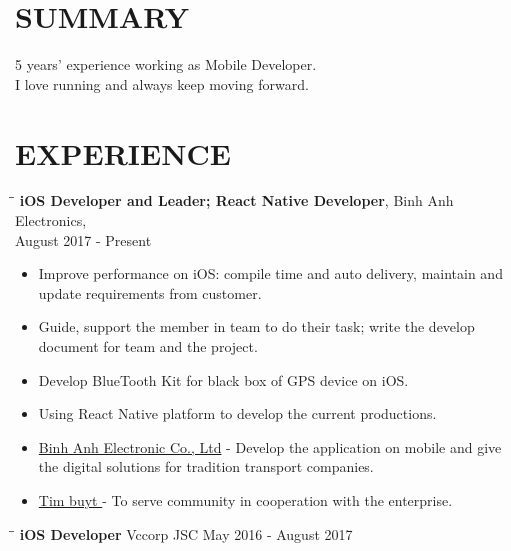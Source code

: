 \documentclass[margin, 10pt]{res}
\begin{document}
\begin{resume}
 
\section{SUMMARY}
   5 years' experience working as Mobile Developer.\\I love running and always keep moving forward.
 
\section{EXPERIENCE}
   \vspace{-0.1in}

   \begin{tabbing}
   \hspace{2.0in}\= \hspace{2.0in}\= \kill %
   {\bf iOS Developer and Leader; React Native Developer}, Binh Anh Electronics,\\August 2017 - Present
   \end{tabbing}\vspace{0pt} %

   \begin{itemize}
		\item Improve performance on iOS: compile time and auto delivery, maintain and update requirements from customer. 
		\item Guide, support the member in team to do their task; write the develop document for team and the project.
		\item Develop BlueTooth Kit for black box of GPS device on iOS.
		\item Using React Native platform to develop the current productions.
		\item {\color{blue}\href{https://itunes.apple.com/vn/developer/binh-anh-electronic-co-ltd/id1020602455?l=vi&mt=8}{Binh Anh Electronic Co., Ltd}} - Develop the application on mobile and give the digital solutions for tradition transport companies.
		\item {\color{blue}\href{https://itunes.apple.com/app/id947703352}{ Tim buyt }} - To serve community in cooperation with the enterprise.
   \end{itemize}

   \begin{tabbing}
   \hspace{2.0in}\= \hspace{2.0in}\= \kill %
   {\bf iOS Developer} \>Vccorp JSC \>May 2016 - August 2017\\
   \end{tabbing}\vspace{-20pt} %


\end{resume}
\end{document}
